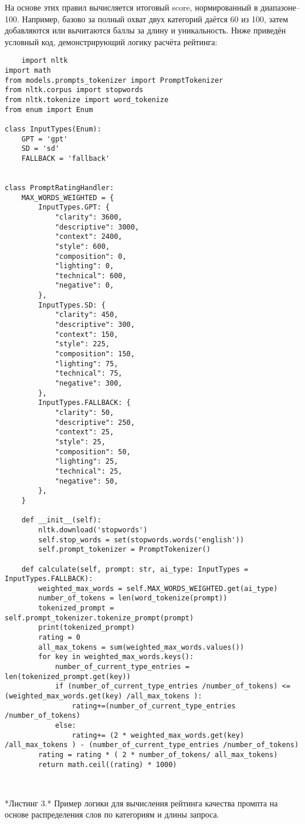 На основе этих правил вычисляется итоговый score, нормированный в диапазоне–100. Например, базово за полный охват двух категорий даётся 60 из 100, затем добавляются или вычитаются баллы за длину и уникальность. Ниже приведён условный код, демонстрирующий логику расчёта рейтинга:
\begin{verbatim}
    import nltk
import math
from models.prompts_tokenizer import PromptTokenizer
from nltk.corpus import stopwords
from nltk.tokenize import word_tokenize
from enum import Enum

class InputTypes(Enum):
    GPT = 'gpt'
    SD = 'sd'
    FALLBACK = 'fallback'


class PromptRatingHandler:
    MAX_WORDS_WEIGHTED = {
        InputTypes.GPT: {
            "clarity": 3600,
            "descriptive": 3000,
            "context": 2400,
            "style": 600,
            "composition": 0,
            "lighting": 0,
            "technical": 600,
            "negative": 0,
        },
        InputTypes.SD: {
            "clarity": 450,
            "descriptive": 300,
            "context": 150,
            "style": 225,
            "composition": 150,
            "lighting": 75,
            "technical": 75,
            "negative": 300,
        },
        InputTypes.FALLBACK: {
            "clarity": 50,
            "descriptive": 250,
            "context": 25,
            "style": 25,
            "composition": 50,
            "lighting": 25,
            "technical": 25,
            "negative": 50,
        },
    }

    def __init__(self):
        nltk.download('stopwords')
        self.stop_words = set(stopwords.words('english'))
        self.prompt_tokenizer = PromptTokenizer()

    def calculate(self, prompt: str, ai_type: InputTypes = InputTypes.FALLBACK):
        weighted_max_words = self.MAX_WORDS_WEIGHTED.get(ai_type)
        number_of_tokens = len(word_tokenize(prompt))
        tokenized_prompt = self.prompt_tokenizer.tokenize_prompt(prompt)
        print(tokenized_prompt)
        rating = 0
        all_max_tokens = sum(weighted_max_words.values())
        for key in weighted_max_words.keys():
            number_of_current_type_entries = len(tokenized_prompt.get(key))
            if (number_of_current_type_entries /number_of_tokens) <= (weighted_max_words.get(key) /all_max_tokens ):
                rating+=(number_of_current_type_entries /number_of_tokens)
            else:
                rating+= (2 * weighted_max_words.get(key) /all_max_tokens ) - (number_of_current_type_entries /number_of_tokens)
        rating = rating * ( 2 * number_of_tokens/ all_max_tokens)
        return math.ceil((rating) * 1000)



\end{verbatim}
*Листинг 3.* Пример логики для вычисления рейтинга качества промпта на основе распределения слов по категориям и длины запроса.

